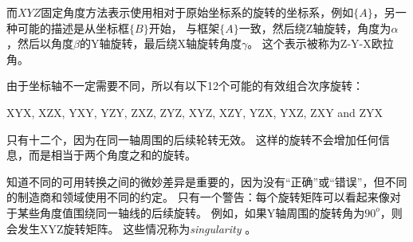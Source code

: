 
而$ XYZ $固定角度方法表示使用相对于原始坐标系的旋转的坐标系，例如$ \{A \} $，另一种可能的描述是从坐标框$ \{B \} $开始， 与框架$ \{A \} $一致，然后绕Z轴旋转，角度为$ \alpha $，然后以角度$ \beta $的Y轴旋转，最后绕X轴旋转角度$ \gamma $。 这个表示被称为Z-Y-X欧拉角。


由于坐标轴不一定需要不同，所以有以下12个可能的有效组合次序旋转：

\begin{center}
XYX, XZX, YXY, YZY, ZXZ, ZYZ, XYZ, XZY, YZX, YXZ, ZXY and ZYX
\end{center}

只有十二个，因为在同一轴周围的后续轮转无效。 这样的旋转不会增加任何信息，而是相当于两个角度之和的旋转。


知道不同的可用转换之间的微妙差异是重要的，因为没有“正确”或“错误”，但不同的制造商和领域使用不同的约定。 只有一个警告：每个旋转矩阵可以看起来像对于某些角度值围绕同一轴线的后续旋转。 例如，如果Y轴周围的旋转角为$ 90 ^ o $，则会发生XYZ旋转矩阵。 这些情况称为\emph {singularity} 。


